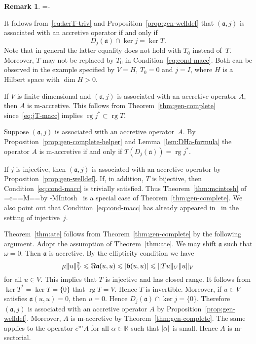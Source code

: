 \documentclass[a4paper,oneside,12pt]{amsart}
\makeatletter
\theoremstyle{plain}
\theoremstyle{definition}
\newtheorem{remark}[theorem]{Remark}
\let\le=\leqslant
\DeclarePairedDelimiter\norm{\lVert}{\rVert}
\DeclarePairedDelimiter\abs{\lvert}{\rvert}
\newenvironment{parenum}[1][]{\my@savedparindent=\parindent\ifthenelse{\equal{#1}{}}{\asparaenum}{\asparaenum[#1]}\advance\itemindent-\my@savedparindent
\patchcmd{\@item}{\ignorespaces}{{\itemindent={\the\itemindent}
\def{}}\ignorespaces}{}{}}
{\endasparaenum}
\DeclareRobustCommand{\Mc}{\setbox0=\hbox{c}\mycheight=\ht0\setbox0=\hbox{M}\myMheight=\ht0\mycshift=\myMheight\advance\mycshift by -\mycheight\mbox{M\raisebox{\mycshift}{c}I}}
\DeclareRobustCommand{\McIntosh}{{\Mc}ntosh\xspace}
\makeatother
\begin{document}
\begin{remark}\label{rem:gen-complete}
\begin{parenum}[1.]
\item It follows from~\eqref{eq:kerT-triv} and Proposition~\ref{prop:gen-welldef} that $({{\mathfrak{{a}}}},j)$ is associated with an accretive operator if and only if 
\[
    D_j({{\mathfrak{{a}}}})\cap\ker j=\ker T.
\]
Note that in general the latter equality does not hold with $T_0$ instead of~$T$. Moreover, $T$ may not be replaced by $T_0$ in Condition~\eqref{eq:cond-macc}.
Both can be observed in the example specified by $V=H$, $T_0=0$ and $j=I$, where $H$ is a Hilbert space with $\dim H>0$.

\item
If $V$ is finite-dimensional and $({{\mathfrak{{a}}}},j)$ is associated with an accretive operator $A$, then $A$ is {\ensuremath{\text{m}}}-accretive.
This follows from Theorem~\ref{thm:gen-complete} since~\eqref{eq:jT-macc} implies $\operatorname{rg} j^* \subset \operatorname{rg} T$.

\item
Suppose $({{\mathfrak{{a}}}},j)$ is associated with an accretive operator~$A$. By Proposition~\ref{prop:gen-complete-helper} and Lemma~\ref{lem:DHa-formula}
the operator $A$ is {\ensuremath{\text{m}}}-accretive if and only if $T(D_j({{\mathfrak{{a}}}}))=\operatorname{rg} j^*$.

\item
If $j$ is injective, then $({{\mathfrak{{a}}}},j)$ is associated with an accretive operator by Proposition~\ref{prop:gen-welldef}.
If, in addition, $T$ is bijective, then Condition~\eqref{eq:cond-macc} is trivially satisfied.
Thus Theorem~\ref{thm:mcintosh} of \McIntosh~\cite[Theorem~3.1]{McIntosh1968:repres} is a special case of Theorem~\ref{thm:gen-complete}.
We also point out that Condition~\eqref{eq:cond-macc} has already appeared 
in~\cite[Theorem~3.5]{McIntosh66:thesis} in the setting of injective~$j$.

\item\label{en:rem-gc-jell}
Theorem~\ref{thm:ate} follows from Theorem~\ref{thm:gen-complete} by the following argument.
Adopt the assumption of Theorem~\ref{thm:ate}. We may shift ${{\mathfrak{{a}}}}$ such that $\omega=0$.
Then ${{\mathfrak{{a}}}}$ is accretive. By the ellipticity condition we have
\[
    \mu\norm{u}^2_V \le \Re{{\mathfrak{{a}}}}(u,u)\le\abs{{{\mathfrak{{b}}}}(u,u)}\le \norm{Tu}_V\norm{u}_V
\]
for all $u\in V$. This implies that $T$ is injective and has closed range. It follows from $\ker T^*=\ker T=\{0\}$ that $\operatorname{rg} T = V$.
Hence $T$ is invertible.
Moreover, if $u\in V$ satisfies ${{\mathfrak{{a}}}}(u,u)=0$, then $u=0$.
Hence $D_j({{\mathfrak{{a}}}})\cap\ker j=\{0\}$. Therefore $({{\mathfrak{{a}}}},j)$ is associated with an accretive operator $A$ by Proposition~\ref{prop:gen-welldef}.
Moreover, $A$ is {\ensuremath{\text{m}}}-accretive by Theorem~\ref{thm:gen-complete}. 
The same applies to the operator $e^{i\alpha}A$ for all $\alpha\in{\mathbb{R}}$ such that $\abs{\alpha}$ is small.
Hence $A$ is {\ensuremath{\text{m}}}-sectorial. 
\end{parenum}
\end{remark}
\end{document}
